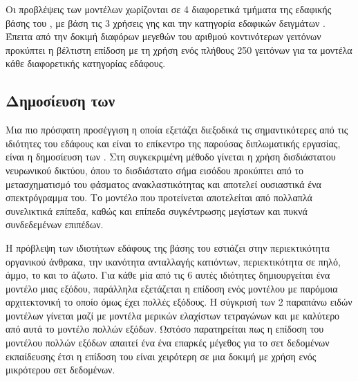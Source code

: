 Οι προβλέψεις των μοντέλων χωρίζονται σε 4 διαφορετικά τμήματα της εδαφικής βάσης του , με βάση τις 3 χρήσεις γης  και την κατηγορία εδαφικών δειγμάτων . Έπειτα από την δοκιμή διαφόρων μεγεθών του αριθμού κοντινότερων γειτόνων προκύπτει η βέλτιστη επίδοση με τη χρήση ενός πλήθους 250 γειτόνων για τα μοντέλα κάθε διαφορετικής κατηγορίας εδάφους.

\subsection{Δημοσίευση των }
Μια πιο πρόσφατη προσέγγιση η οποία εξετάζει διεξοδικά τις σημαντικότερες από τις ιδιότητες του εδάφους και είναι το επίκεντρο της παρούσας διπλωματικής εργασίας, είναι η δημοσίευση των  \cite{padarian_lucas_soil}. Στη συγκεκριμένη μέθοδο γίνεται η χρήση δισδιάστατου νευρωνικού δικτύου, όπου το δισδιάστατο σήμα εισόδου προκύπτει από το μετασχηματισμό  του φάσματος ανακλαστικότητας και αποτελεί ουσιαστικά ένα σπεκτρόγραμμα του. Το μοντέλο που προτείνεται αποτελείται από πολλαπλά συνελικτικά επίπεδα, καθώς και επίπεδα συγκέντρωσης μεγίστων και πυκνά συνδεδεμένων επιπέδων.

Η πρόβλεψη των ιδιοτήτων εδάφους της βάσης του  εστιάζει στην περιεκτικότητα οργανικού άνθρακα, την ικανότητα ανταλλαγής κατιόντων, περιεκτικότητα σε πηλό, άμμο, το  και το άζωτο. Για κάθε μία από τις 6 αυτές ιδιότητες δημιουργείται ένα μοντέλο μιας εξόδου, παράλληλα εξετάζεται η επίδοση ενός μοντέλου με παρόμοια αρχιτεκτονική το οποίο όμως έχει πολλές εξόδους. Η σύγκρισή των 2 παραπάνω ειδών μοντέλων γίνεται μαζί με μοντέλα μερικών ελαχίστων τετραγώνων και  με καλύτερο από αυτά το μοντέλο πολλών εξόδων. Ωστόσο παρατηρείται πως η επίδοση του μοντέλου πολλών εξόδων απαιτεί ένα ένα επαρκές μέγεθος για το σετ δεδομένων εκπαίδευσης έτσι η επίδοση του είναι χειρότερη σε μια δοκιμή με χρήση ενός μικρότερου σετ δεδομένων.
